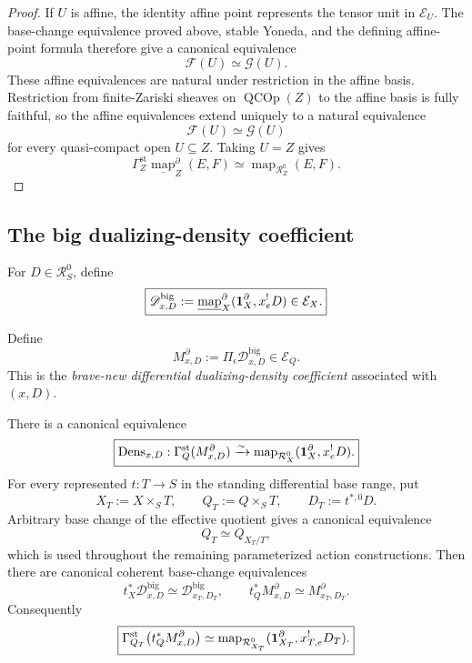 \begin{proof}
If \(U\) is affine, the identity affine point represents the tensor unit in \(\mathcal E_U\). The base-change equivalence proved above, stable Yoneda, and the defining affine-point formula therefore give a canonical equivalence
\[
    \mathcal F(U)
    \simeq
    \mathcal G(U).
\]
These affine equivalences are natural under restriction in the affine basis. Restriction from finite-Zariski sheaves on \(\operatorname{QCOp}(Z)\) to the affine basis is fully faithful, so the affine equivalences extend uniquely to a natural equivalence
\[
    \mathcal F(U)
    \simeq
    \mathcal G(U)
\]
for every quasi-compact open \(U\subseteq Z\). Taking \(U=Z\) gives
\[
    \Gamma_Z^{\mathrm{st}}
    \underline{\operatorname{map}}^{\partial}_{Z}(E,F)
    \simeq
    \operatorname{map}_{\mathcal R_Z^0}(E,F).
\]
\end{proof}

\subsection{The big dualizing-density coefficient}

\begin{definition}
\label{def:var-big-density-coefficient}
For \(D\in\mathcal R_S^0\), define
\[
    \boxed{
    \mathscr D_{x,D}^{\mathrm{big}}
    :=
    \underline{\operatorname{map}}^{\partial}_{X}
    (\mathbf 1_X^\partial,x_e^!D)
    \in
    \mathcal E_X.
    }
\]
\end{definition}

\begin{definition}
\label{def:var-dualizing-density-Q}
Define
\[
    \boxed{
    M^\partial_{x,D}
    :=
    \Pi_\epsilon\mathscr D_{x,D}^{\mathrm{big}}
    \in\mathcal E_Q.
    }
\]
This is the \emph{brave-new differential dualizing-density coefficient} associated with \((x,D)\).
\end{definition}

\begin{theorem}
\label{thm:var-density-realization}
There is a canonical equivalence
\[
    \boxed{
    \operatorname{Dens}_{x,D}:
    \Gamma_Q^{\mathrm{st}}(M^\partial_{x,D})
    \xrightarrow{\sim}
    \operatorname{map}_{\mathcal R_X^0}
    (\mathbf 1_X^\partial,x_e^!D).
    }
\]
For every represented \(t:T\to S\) in the standing differential base range, put
\[
    X_T:=X\times_ST,
    \qquad
    Q_T:=Q\times_ST,
    \qquad
    D_T:=t^{*,0}D.
\]
Arbitrary base change of the effective quotient gives a canonical equivalence
\[
    \boxed{
    Q_T\simeq Q_{X_T/T},
    }
\]
which is used throughout the remaining parameterized action constructions. Then there are canonical coherent base-change equivalences
\[
    \boxed{
    t_X^*\mathscr D_{x,D}^{\mathrm{big}}
    \simeq
    \mathscr D_{x_T,D_T}^{\mathrm{big}},
    \qquad
    t_Q^*M^\partial_{x,D}
    \simeq
    M^\partial_{x_T,D_T}.
    }
\]
Consequently
\[
    \boxed{
    \Gamma_{Q_T}^{\mathrm{st}}
    \bigl(t_Q^*M^\partial_{x,D}\bigr)
    \simeq
    \operatorname{map}_{\mathcal R_{X_T}^0}
    (\mathbf 1_{X_T}^\partial,x_{T,e}^!D_T).
    }
\]
\end{theorem}

